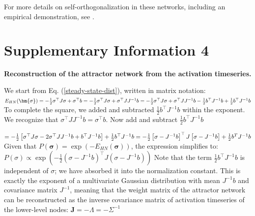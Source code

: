\documentclass{article}
\begin{document}
For more details on self-orthogonalization in these networks, including an empirical demonstration, see \citep{https://doi.org/10.48550/arxiv.2505.22749}.

\section{Supplementary Information 4}

\textbf{Reconstruction of the attractor network from the activation timeseries.}

We start from Eq. (\ref{steady-state-dist}), written in matrix notation: \newline
$E_{HN}(\bm{\sigma}) = -\frac{1}{2} \sigma^\top J \sigma + \sigma^\top b \\ 
= -\frac{1}{2} \sigma^\top J \sigma + \sigma^\top J J^{ -1} b \\
= -\frac{1}{2} \sigma^\top J \sigma + \sigma^\top J J^{ -1} b - \frac{1}{2} b^\top J^{ -1} b + \frac{1}{2} b^\top J^{ -1} b$ \newline
\newline
To complete the square, we added and subtracted  $\frac{1}{2} b^\top J^{ -1} b$  within the exponent.
We recognize that  $\sigma^\top J J^{ -1} b = \sigma^\top b$. Now add and subtract  $\frac{1}{2} b^\top J^{ -1} b$

$= -\frac{1}{2} \left[\sigma^\top J \sigma - 2 \sigma^\top J J^{ -1} b + b^\top J^{ -1} b \right] + \frac{1}{2} b^\top J^{ -1} b \\
= -\frac{1}{2} \left[\sigma - J^{ -1} b \right]^\top J \left[\sigma - J^{ -1} b\right] + \frac{1}{2} b^T J^{ -1} b$ \newline
\newline
Given that $P(\bm{\sigma}) = \exp( -E_{HN}(\bm{\sigma}))$, the expression simplifies to:
$P(\sigma) \propto \exp\left( -\frac{1}{2} (\sigma - J^{ -1} b)^\top J (\sigma - J^{ -1} b) \right)$ \newline
\newline
Note that the term  $\frac{1}{2} b^\top J^{ -1} b$  is independent of  $\sigma$; we have absorbed it into the normalization constant.
\newline
This is exactly the exponent of a multivariate Gaussian distribution with mean $J^{ -1} b$ and covariance matrix $J^{ -1}$, meaning that the weight matrix of the attractor network can be reconstructed as the inverse covariance matrix of activation timeseries of the lower-level nodes:
$\mathbf{J} = -\Lambda = -\Sigma^{ -1}$





\end{document}

